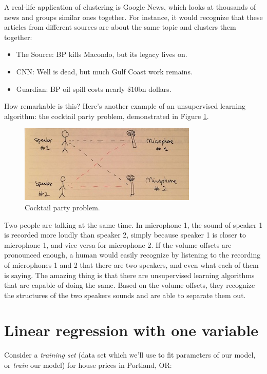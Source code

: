 \documentclass{article}
\theoremstyle{definition}
\begin{document}
A real-life application of clustering is Google News, which looks at thousands of news and groups similar ones together. For instance, it would recognize that these articles from different sources are about the same topic and clusters them together:

\begin{itemize}
    \item The Source: BP kills Macondo, but its legacy lives on.
    \item CNN: Well is dead, but much Gulf Coast work remains.
    \item Guardian: BP oil spill costs nearly $\$10$bn dollars.
\end{itemize}

How remarkable is this? Here's another example of an unsupervised learning algorithm: the cocktail party problem, demonstrated in Figure \ref{intro-cocktail}.

\begin{figure}[ht]
\centering
\includegraphics[scale=0.8]{images/intro/cocktail.jpg}
\caption{Cocktail party problem.}
\label{intro-cocktail}
\end{figure}

Two people are talking at the same time. In microphone 1, the sound of speaker 1 is recorded more loudly than speaker 2, simply because speaker 1 is closer to microphone 1, and vice versa for microphone 2. If the volume offsets are pronounced enough, a human would easily recognize by listening to the recording of microphones 1 and 2 that there are two speakers, and even what each of them is saying. The amazing thing is that there are unsupervised learning algorithms that are capable of doing the same. Based on the volume offsets, they recognize the structures of the two speakers sounds and are able to separate them out.


\section{Linear regression with one variable}
Consider a \textit{training set} (data set which we'll use to fit parameters of our model, or \textit{train} our model) for house prices in Portland, OR:
\end{document}

